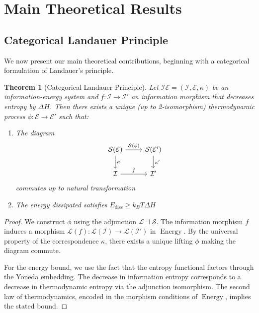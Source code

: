 \documentclass[12pt]{article}
\newtheorem{theorem}{Theorem}[section]
\DeclareMathOperator{\Energy}{Energy}
\begin{document}
\section{Main Theoretical Results}

\subsection{Categorical Landauer Principle}

We now present our main theoretical contributions, beginning with a categorical formulation of Landauer's principle.

\begin{theorem}[Categorical Landauer Principle]
Let $\mathcal{IE} = (\mathcal{I}, \mathcal{E}, \kappa)$ be an information-energy system and $f: \mathcal{I} \to \mathcal{I}'$ an information morphism that decreases entropy by $\Delta H$. Then there exists a unique (up to 2-isomorphism) thermodynamic process $\phi: \mathcal{E} \to \mathcal{E}'$ such that:
\begin{enumerate}
\item The diagram
\[\begin{tikzcd}
\mathcal{S}(\mathcal{E}) \arrow[r, "\mathcal{S}(\phi)"] \arrow[d, "\kappa"] & \mathcal{S}(\mathcal{E}') \arrow[d, "\kappa'"] \\
\mathcal{I} \arrow[r, "f"] & \mathcal{I}'
\end{tikzcd}\]
commutes up to natural transformation
\item The energy dissipated satisfies $E_{\text{diss}} \geq k_B T \Delta H$
\end{enumerate}
\end{theorem}

\begin{proof}
We construct $\phi$ using the adjunction $\mathcal{L} \dashv \mathcal{S}$. The information morphism $f$ induces a morphism $\mathcal{L}(f): \mathcal{L}(\mathcal{I}) \to \mathcal{L}(\mathcal{I}')$ in $\Energy$. By the universal property of the correspondence $\kappa$, there exists a unique lifting $\phi$ making the diagram commute.

For the energy bound, we use the fact that the entropy functional factors through the Yoneda embedding. The decrease in information entropy corresponds to a decrease in thermodynamic entropy via the adjunction isomorphism. The second law of thermodynamics, encoded in the morphism conditions of $\Energy$, implies the stated bound.
\end{proof}
\end{document}
